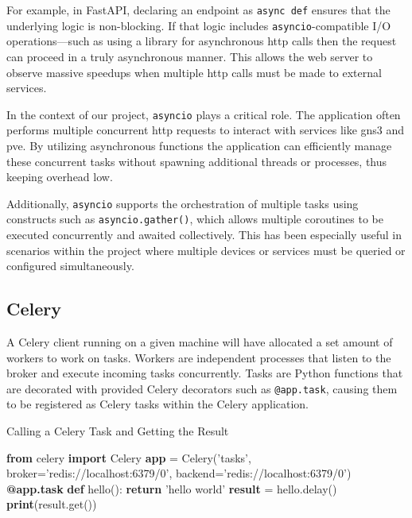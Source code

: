   For example, in FastAPI, declaring an endpoint as \texttt{async def} ensures that the underlying logic is non-blocking. 
  If that logic includes \texttt{asyncio}-compatible I/O operations—such as using a library for asynchronous \ac{http} calls 
  then the request can proceed in a truly asynchronous manner. This allows the web server to observe massive speedups when
  multiple \ac{http} calls must be made to external services.

  In the context of our project, \texttt{asyncio} plays a critical role. The application often performs multiple concurrent 
  \ac{http} requests to interact with services like \ac{gns3} and \ac{pve}. By utilizing asynchronous functions the application 
  can efficiently manage these concurrent tasks without spawning additional threads or processes, thus keeping overhead low.

  Additionally, \texttt{asyncio} supports the orchestration of multiple tasks using constructs such as \texttt{asyncio.gather()}, 
  which allows multiple coroutines to be executed concurrently and awaited collectively. This has been especially useful in 
  scenarios within the project where multiple devices or services must be queried or configured simultaneously.

\subsection{Celery}

A Celery client running on a given machine will have allocated a set amount of workers to work on tasks. Workers are 
independent processes that listen to the broker and execute incoming tasks concurrently. Tasks are Python functions that 
are decorated with provided Celery decorators such as \texttt{@app.task}, causing them to be registered as Celery tasks 
within the Celery application.

\begin{algorithm}
  \caption{Calling a Celery Task and Getting the Result}\label{celery-call-result}
  \begin{algorithmic}[1]
    \State \textbf{from} celery \textbf{import} Celery
    \State
    \State \textbf{app} = Celery('tasks', broker='redis://localhost:6379/0', backend='redis://localhost:6379/0')
    \State
    \State \textbf{@app.task}
    \State \textbf{def} hello():
    \State \hspace{1em} \textbf{return} 'hello world'
    \State
    \State \textbf{result} = hello.delay()
    \State \textbf{print}(result.get())
  \end{algorithmic}
\end{algorithm}

